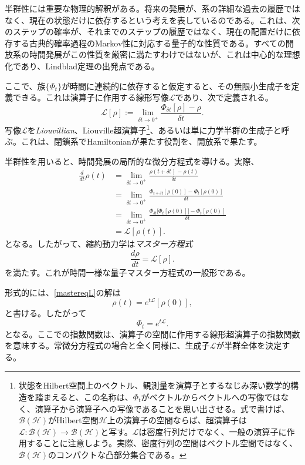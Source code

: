 \documentclass[a4paper,11pt,oneside]{article}
\theoremstyle{definition}
\numberwithin{equation}{section}
\renewcommand{\L}{\mathcal{L}}
\renewcommand{\H}{\mathcal{H}}
\begin{document}
半群性には重要な物理的解釈がある。将来の発展が、系の詳細な過去の履歴ではなく、現在の状態だけに依存するという考えを表しているのである。これは、次のステップの確率が、それまでのステップの履歴ではなく、現在の配置だけに依存する古典的確率過程のMarkov性に対応する量子的な性質である。すべての開放系の時間発展がこの性質を厳密に満たすわけではないが、これは中心的な理想化であり、Lindblad定理の出発点である。



ここで、族$\{\Phi_t\}$が時間に連続的に依存すると仮定すると、その無限小生成子を定義できる。これは演算子に作用する線形写像$\mathcal L$であり、次で定義される。
\begin{equation}\label{Liouvilliandef}
\mathcal L[\rho]
:=
\lim_{\delta t\to 0^+}
\frac{\Phi_{\delta t}[\rho]-\rho}{\delta t} .
\end{equation}
写像$\mathcal L$を\textit{Liouvillian}、Liouville超演算子\footnote{状態をHilbert空間上のベクトル、観測量を演算子とするなじみ深い数学的構造を踏まえると、この名称は、$ \Phi_{t}$がベクトルからベクトルへの写像ではなく、演算子から演算子への写像であることを思い出させる。式で書けば、$ \mathcal{B}(\H)$がHilbert空間$ \H$上の演算子の空間ならば、超演算子は$ \L:\mathcal{B}(\H) \to \mathcal{B}(\H)$と写す。$ \L$は密度行列だけでなく、一般の演算子に作用することに注意しよう。実際、密度行列の空間はベクトル空間ではなく、$\mathcal B(\mathcal H) $のコンパクトな凸部分集合である。}、あるいは単に力学半群の生成子と呼ぶ。これは、閉鎖系でHamiltonianが果たす役割を、開放系で果たす。



半群性を用いると、時間発展の局所的な微分方程式を導ける。実際、
\begin{align}
\frac{d}{dt}\rho(t)
&=
\lim_{\delta t\to 0^+}
\frac{\rho(t+\delta t)-\rho(t)}{\delta t}
\nonumber\\
&=
\lim_{\delta t\to 0^+}
\frac{\Phi_{t+\delta t}[\rho(0)]-\Phi_t[\rho(0)]}{\delta t}
\nonumber\\
&=
\lim_{\delta t\to 0^+}
\frac{\Phi_{\delta t}\bigl[\Phi_t[\rho(0)]\bigr]-\Phi_t[\rho(0)]}{\delta t}
\nonumber\\
&=
\mathcal L[\rho(t)] .
\end{align}
となる。したがって、縮約動力学は\textit{マスター方程式}
\begin{equation}\label{mastereqL}
\frac{d\rho}{dt} = \mathcal L[\rho] .
\end{equation}
を満たす。これが時間一様な量子マスター方程式の一般形である。



形式的には、\eqref{mastereqL}の解は
\begin{equation}
\rho(t)=e^{t\mathcal L}[\rho(0)] ,
\end{equation}
と書ける。したがって
\begin{equation}
\Phi_t = e^{t\mathcal L} .
\end{equation}
となる。ここでの指数関数は、演算子の空間に作用する線形超演算子の指数関数を意味する。常微分方程式の場合と全く同様に、生成子$\mathcal L$が半群全体を決定する。
\end{document}
